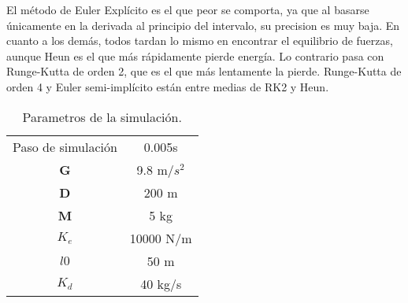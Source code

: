 \documentclass{article}
\begin{document}
El método de Euler Explícito es el que peor se comporta, ya que al basarse únicamente en la derivada al principio del intervalo, su precision es muy baja. En cuanto a los demás, todos tardan lo mismo en encontrar el equilibrio de fuerzas, aunque Heun es el que más rápidamente pierde energía. Lo contrario pasa con Runge-Kutta de orden 2, que es el que más lentamente la pierde. Runge-Kutta de orden 4 y Euler semi-implícito están entre medias de RK2 y Heun.
\begin{table}[ht]
    \centering
    \begin{tabular}{cc}
        Paso de simulación & 0.005s      \\
        \textbf{G}         & 9.8 m/$s^2$ \\
        \textbf{D}         & 200 m       \\
        \textbf{M}         & 5 kg        \\
        \textbf{$K_e$}     & 10000 N/m   \\
        \textbf{$l0$}      & 50 m        \\
        \textbf{$K_d$}     & 40 kg/s     \\
    \end{tabular}
    \caption{Parametros de la simulación.}
    \label{tab:parametros_2}
\end{table}
\end{document}
